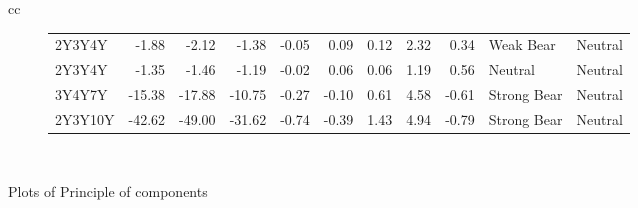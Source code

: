 \documentclass[a4paper,twoside]{report}
\begin{document}
\begin{figure}[htbp]
\begin{tabular}[c]{cc}
\begin{subfigure}[c]{0.5\textwidth}
\begin{adjustbox}{max width=\textwidth}
\begin{tabular}{lrrrrrrrrll}
    2Y3Y4Y &  -1.88 &    -2.12 &     -1.38 &  -0.05 &  0.09 &      0.12 &   2.32 &     0.34 &    Weak Bear &           Neutral \\
    2Y3Y4Y &  -1.35 &    -1.46 &     -1.19 &  -0.02 &  0.06 &      0.06 &   1.19 &     0.56 &      Neutral &           Neutral \\
    3Y4Y7Y & -15.38 &   -17.88 &    -10.75 &  -0.27 & -0.10 &      0.61 &   4.58 &    -0.61 &  Strong Bear &           Neutral \\
   2Y3Y10Y & -42.62 &   -49.00 &    -31.62 &  -0.74 & -0.39 &      1.43 &   4.94 &    -0.79 &  Strong Bear &           Neutral \\
\hline
\end{tabular}
\end{adjustbox}
 \end{subfigure}\\
 
 
 
\end{tabular}
 \caption{Plots of Principle of components}\label{fig:bubble plots}
 \end{figure}  
\end{document}
